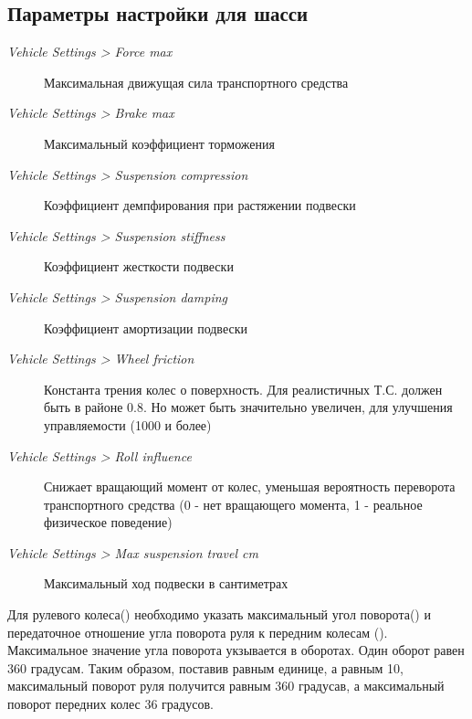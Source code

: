 \documentclass[a4paper,12pt,oneside]{sphinxmanual}
\begin{document}
\subsection{Параметры настройки для шасси}
\label{physics:id6}\begin{description}
\item[{\emph{Vehicle Settings \textgreater{} Force max}}] \leavevmode
Максимальная движущая сила транспортного средства

\item[{\emph{Vehicle Settings \textgreater{} Brake max}}] \leavevmode
Максимальный коэффициент торможения

\item[{\emph{Vehicle Settings \textgreater{} Suspension compression}}] \leavevmode
Коэффициент демпфирования при растяжении подвески

\item[{\emph{Vehicle Settings \textgreater{} Suspension stiffness}}] \leavevmode
Коэффициент жесткости подвески

\item[{\emph{Vehicle Settings \textgreater{} Suspension damping}}] \leavevmode
Коэффициент амортизации подвески

\item[{\emph{Vehicle Settings \textgreater{} Wheel friction}}] \leavevmode
Константа трения колес о поверхность. Для реалистичных Т.С. должен быть в районе 0.8. Но может быть значительно увеличен, для улучшения управляемости (1000 и более)

\item[{\emph{Vehicle Settings \textgreater{} Roll influence}}] \leavevmode
Снижает вращающий момент от колес, уменьшая вероятность переворота транспортного средства (0 - нет вращающего момента, 1 - реальное физическое поведение)

\item[{\emph{Vehicle Settings \textgreater{} Max suspension travel cm}}] \leavevmode
Максимальный ход подвески в сантиметрах

\end{description}

Для рулевого колеса() необходимо указать максимальный угол поворота() и передаточное отношение угла поворота руля к
передним колесам (). Максимальное значение угла поворота укзывается в оборотах. Один оборот равен 360 градусам. Таким образом,
поставив  равным единице, а  равным 10, максимальный поворот руля получится равным 360 градусав, а максимальный
поворот передних колес 36 градусов.
\end{document}
